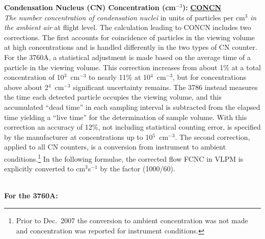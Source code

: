 \begin{hangparagraphs}
\textbf{Condensation Nucleus (CN) Concentration (cm$^{-3}$):}\hypertarget{CONCN}{}\textbf{
}\textbf{\uline{CONCN}}\\
\emph{The number concentration of condensation nuclei} in units of
particles per cm$^{3}$ \emph{in the ambient air} at flight level.\emph{
}The calculation leading to CONCN includes
two corrections. The first accounts
for coincidence of particles in the viewing volume at high concentrations
and is handled differently in the two types of CN counter. For the
3760A, a statistical adjustment is made based on the average time
of a particle in the viewing volume. This correction increases from
about 1\% at a total concentration of 10$^{3}$~cm$^{-3}$ to nearly
11\% at 10$^{4}$~cm$^{-3}$, but for concentrations above about
2$^{4}$~cm$^{-3}$ significant uncertainty remains.
The 3786 instead measures the time each detected particle occupies
the viewing volume, and this\emph{ }accumulated \textquotedblleft dead
time\textquotedblright {} in each sampling
interval is subtracted from the elapsed time yielding a \textquotedblleft live
time\textquotedblright{} for the determination of sample volume. With
this correction an accuracy of 12\%, not including statistical counting
error, is specified by the manufacturer at concentrations up to 10$^{5}$~cm$^{-3}$.
The second correction, applied to all CN counters, is a conversion
from instrument to ambient conditions.\footnote{Prior to Dec.~2007 the conversion to ambient concentration was not
made and concentration was reported for instrument conditions.} In the following formulae, the corrected flow FCNC in VLPM is explicitly
converted to cm$^{3}$s$^{-1}$ by the factor (1000/60).\emph{}\\
\emph{}\\
\noindent\begin{minipage}[t]{1\columnwidth}%
\textbf{For the 3760A:}\\
\end{minipage}
\end{hangparagraphs}
